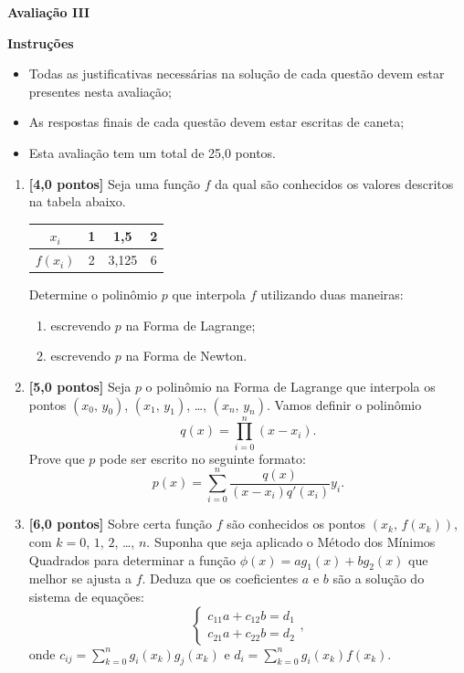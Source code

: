 \documentclass[10pt,a4paper]{article}
\begin{document}
\begin{center}
 \textbf{Avaliação III}
\end{center}

\textbf{Instruções}
\begin{itemize}
 \item Todas as justificativas necessárias na solução de cada questão devem estar presentes nesta avaliação;
 \item As respostas finais de cada questão devem estar escritas de caneta;
 \item Esta avaliação tem um total de 25,0 pontos.
\end{itemize}

\begin{enumerate}
 
 \item \textbf{[4,0 pontos]} Seja uma função $f$ da qual são conhecidos os valores descritos na tabela abaixo.
  \begin{center}
   \begin{tabular}{c|c|c|c}
    $x_i$ & 1 & 1,5 & 2\\ \hline
    $f(x_i)$ & 2 & 3,125 & 6
   \end{tabular}
  \end{center}

  Determine o polinômio $p$ que interpola $f$ utilizando duas maneiras:
  \begin{enumerate}
   \item escrevendo $p$ na Forma de Lagrange;
   \item escrevendo $p$ na Forma de Newton.
  \end{enumerate}
 
 \item \textbf{[5,0 pontos]} Seja $p$ o polinômio na Forma de Lagrange que interpola os pontos $(x_0,\,y_0)$, $(x_1,\,y_1)$, \ldots, $(x_n,\,y_n)$. Vamos definir o 
polinômio $$q(x) = \prod_{i=0}^{n} (x-x_i).$$ Prove que $p$ pode ser escrito no seguinte formato: 
$$p(x) = \sum_{i=0}^n\frac{q(x)}{(x-x_i)q'(x_i)}y_i.$$

  \item \textbf{[6,0 pontos]} Sobre certa função $f$ são conhecidos os pontos $(x_k,\,f(x_k))$, com $k=0$, $1$, $2$, \ldots, $n$. Suponha que seja 
aplicado o Método dos Mínimos Quadrados para determinar a função $\phi(x) = ag_1(x) + bg_2(x)$ que melhor se ajusta a $f$. Deduza que os coeficientes $a$ e 
$b$ são a solução do sistema de equações:
$$\begin{cases}
   c_{11}a + c_{12}b = d_1 \\
   c_{21}a + c_{22}b = d_2
  \end{cases},
$$
onde $\displaystyle c_{ij} = \sum_{k=0}^n g_i(x_k)g_j(x_k)$ e $\displaystyle d_{i} = \sum_{k=0}^n g_i(x_k)f(x_k)$.


\end{enumerate}
\end{document}
